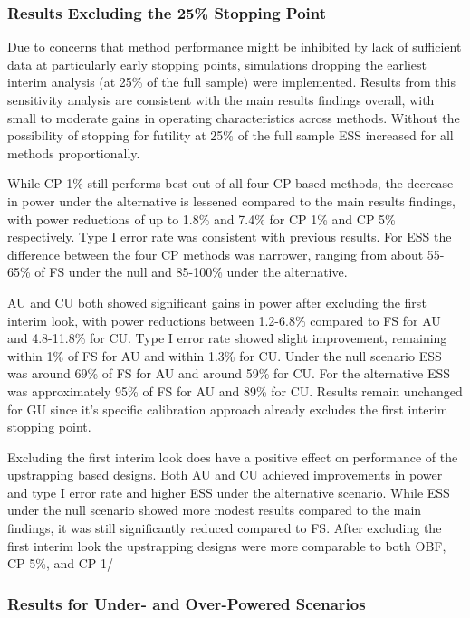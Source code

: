 \documentclass[Afour,sageh,times,square,numbers]{sagej}
\begin{document}
\subsubsection{Results Excluding the 25\% Stopping Point}

Due to concerns that method performance might be inhibited by lack of sufficient data at particularly early stopping points, simulations dropping the earliest interim analysis (at 25\% of the full sample) were implemented.  Results from this sensitivity analysis are consistent with the main results findings overall, with small to moderate gains in operating characteristics across methods.  Without the possibility of stopping for futility at 25\% of the full sample ESS increased for all methods proportionally.  

While CP 1\% still performs best out of all four CP based methods, the decrease in power under the alternative is lessened compared to the main results findings, with power reductions of up to 1.8\% and 7.4\% for CP 1\% and CP 5\% respectively.  Type I error rate was consistent with previous results.  For ESS the difference between the four CP methods was narrower, ranging from about 55-65\% of FS under the null and 85-100\% under the alternative.

AU and CU both showed significant gains in power after excluding the first interim look, with power reductions between 1.2-6.8\% compared to FS for AU and 4.8-11.8\% for CU.  Type I error rate showed slight improvement, remaining within 1\% of FS for AU and within 1.3\% for CU.  Under the null scenario ESS was around 69\% of FS for AU and around 59\% for CU.  For the alternative ESS was approximately 95\% of FS for AU and 89\% for CU.  Results remain unchanged for GU since it's specific calibration approach already excludes the first interim stopping point.    

Excluding the first interim look does have a positive effect on performance of the upstrapping based designs.  Both AU and CU achieved improvements in power and type I error rate and higher ESS under the alternative scenario.  While ESS under the null scenario showed more modest results compared to the main findings, it was still significantly reduced compared to FS.  After excluding the first interim look the upstrapping designs were more comparable to both OBF, CP 5\%, and CP 1/%

\subsubsection{Results for Under- and Over-Powered Scenarios}
\end{document}
